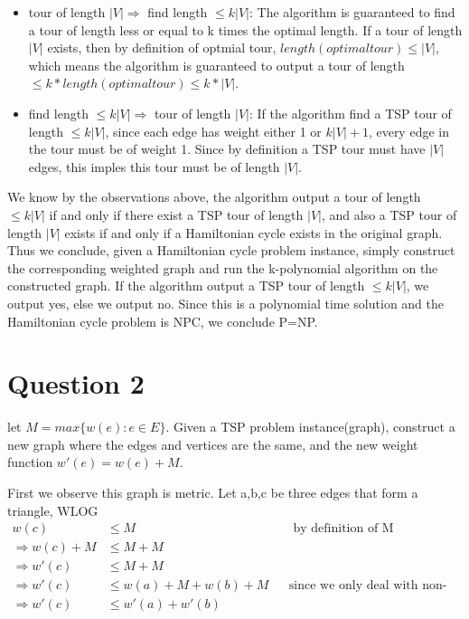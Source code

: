 \documentclass{article}
\begin{document}
    \begin{itemize}
        \item tour of length $|V| \Rightarrow$ find length $\le k|V|$: The algorithm is guaranteed to find a tour of
            length less or equal to k times the optimal length. If a tour of length $|V|$ exists, then
            by definition of optmial tour, $length(optimal tour)\le |V|$, which means the algorithm is guaranteed to output
            a tour of length $\le k*length(optimal tour) \leq k*|V|$.
        \item find length $\le k|V| \Rightarrow$ tour of length $|V|$: If the algorithm find a TSP tour of length $\leq k|V|$,
            since each edge has weight either 1 or $k|V|+1$, every edge in the tour must be of weight 1. 
            Since by definition a TSP tour must have $|V|$ edges, this imples this tour must be of length $|V|$.
    \end{itemize}

    We know by the observations above, the algorithm output a tour of length $\le k|V|$ if and only if
    there exist a TSP tour of length $|V|$, and also a TSP tour of length $|V|$ exists if and only if a Hamiltonian
    cycle exists in the original graph. Thus we conclude, given a Hamiltonian cycle problem instance, simply construct
    the corresponding weighted graph and run the k-polynomial algorithm on the constructed graph. If the algorithm 
    output a TSP tour of length $\le k|V|$, we output yes, else we output no. Since this is a polynomial time solution and
    the Hamiltonian cycle problem is NPC, we conclude P=NP.

\section*{Question 2}
    let $M = max \{w(e): e \in E\}$. Given a TSP problem instance(graph), construct a new graph
    where the edges and vertices are the same, and the new weight function $w'(e) = w(e)+M$.

    First we observe this graph is metric. Let a,b,c be three edges that form a triangle, WLOG \\
    \begin{align*}
        w(c) &\le M && \text{ by definition of M }\\
        \Rightarrow w(c) + M &\le M + M \\
        \Rightarrow w'(c) &\le M + M \\
        \Rightarrow w'(c) &\le w(a) + M + w(b) + M && \text{since we only deal with non-negative weight functions in this course} \\
        \Rightarrow w'(c) &\le w'(a) + w'(b)
    \end{align*}
\end{document}
